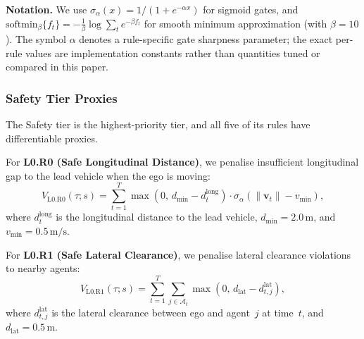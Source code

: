 \textbf{Notation.}  We use $\sigma_\alpha(x) = 1/(1{+}e^{-\alpha x})$ for sigmoid gates, and $\text{softmin}_\beta\{f_t\} = -\frac{1}{\beta}\log\sum_t e^{-\beta f_t}$ for smooth minimum approximation (with $\beta{=}10$).  The symbol $\alpha$ denotes a rule-specific gate sharpness parameter; the exact per-rule values are implementation constants rather than quantities tuned or compared in this paper.

\subsubsection{Safety Tier Proxies}

The Safety tier is the highest-priority tier, and all five of its rules have differentiable proxies.

For \textbf{L0.R0 (Safe Longitudinal Distance)}, we penalise insufficient longitudinal gap to the lead vehicle when the ego is moving:
\begin{equation}
V_{\text{L0.R0}}(\tau; s)=\sum_{t=1}^{T}\max\!\left(0,\,d_{\min}-d_t^{\text{long}}\right)\cdot \sigma_\alpha\!\left(\|\mathbf{v}_t\|-v_{\min}\right),
\end{equation}
where $d_t^{\text{long}}$ is the longitudinal distance to the lead vehicle, $d_{\min}{=}2.0\,\mathrm{m}$, and $v_{\min}{=}0.5\,\mathrm{m/s}$.

For \textbf{L0.R1 (Safe Lateral Clearance)}, we penalise lateral clearance violations to nearby agents:
\begin{equation}
V_{\text{L0.R1}}(\tau; s)=\sum_{t=1}^{T}\sum_{j\in\mathcal{A}_t}\max\!\left(0,\,d_{\text{lat}}-d_{t,j}^{\text{lat}}\right),
\end{equation}
where $d_{t,j}^{\text{lat}}$ is the lateral clearance between ego and agent~$j$ at time~$t$, and $d_{\text{lat}}{=}0.5\,\mathrm{m}$.

